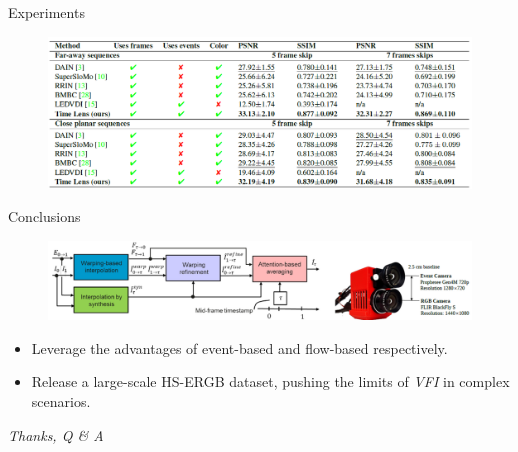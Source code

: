 \documentclass[aspectratio=43]{beamer}
\begin{document}
\begin{frame}{Experiments}
{\begin{itemize}
				\begin{figure}
					\centering\includegraphics[width=0.95\linewidth]{images/Time_lens_quatitative_results_three.png}
				\end{figure} 
			\end{itemize}
		}
		

	\end{frame}

	\begin{frame}{Conclusions}
		\begin{figure}
			\centering\includegraphics[width=0.85\linewidth]{images/Time_Lens_conclusion.png}
		\end{figure}
		\begin{itemize}
			\item Leverage the advantages of \alert{event-based and flow-based} respectively.
			\item Release a large-scale \alert{HS-ERGB dataset}, pushing the limits of \textit{VFI} in complex scenarios.
		\end{itemize}
	\end{frame}
	
	\begin{frame}{}
		\centering \Huge
		\emph{Thanks,  Q \& A }
	\end{frame}
    
\end{document}
